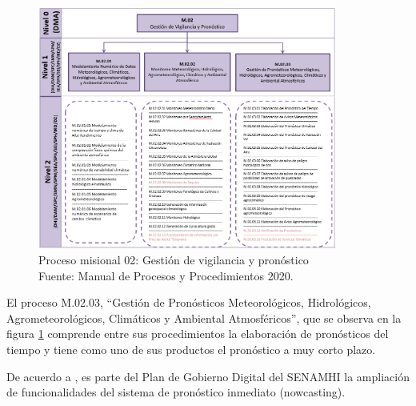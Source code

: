 \begin{figure}[H]
  \centering
  \includegraphics[height=8cm]{E_IMAGENES/2_MarcoTeorico/PM02}
  \caption[SENAMHI PM.02: Gestión de vigilancia y pronóstico]{
    Proceso misional 02: Gestión de vigilancia y pronóstico\\
    Fuente: Manual de Procesos y Procedimientos 2020.
  }
  \label{fig:pm02}
\end{figure}

El proceso M.02.03, ``Gestión de Pronósticos Meteorológicos, Hidrológicos, 
Agrometeorológicos, Climáticos y Ambiental Atmosféricos'', que se observa en la 
figura \ref{fig:pm02} comprende entre sus procedimientos la elaboración de 
pronósticos del tiempo y tiene como uno de sus productos el pronóstico a muy 
corto plazo. 

De acuerdo a \cite{senamhi2021govdig}, es parte del Plan de Gobierno Digital del 
SENAMHI la ampliación de funcionalidades del sistema de pronóstico inmediato 
(nowcasting).
